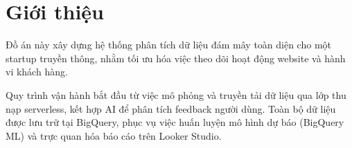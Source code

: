 \section{Giới thiệu}

Đồ án này xây dựng hệ thống phân tích dữ liệu đám mây toàn diện cho một startup truyền thông, nhằm tối ưu hóa việc theo dõi hoạt động website và hành vi khách hàng.

Quy trình vận hành bắt đầu từ việc mô phỏng và truyền tải dữ liệu qua lớp thu nạp serverless, kết hợp AI để phân tích feedback người dùng. Toàn bộ dữ liệu được lưu trữ tại BigQuery, phục vụ việc huấn luyện mô hình dự báo (BigQuery ML) và trực quan hóa báo cáo trên Looker Studio.
